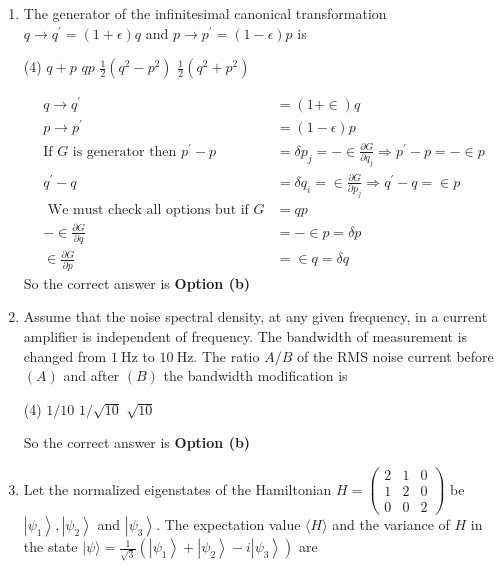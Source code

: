 \begin{enumerate}
\item The generator of the infinitesimal canonical transformation $q \rightarrow q^{\prime}=(1+\epsilon) q$ and $p \rightarrow p^{\prime}=(1-\epsilon) p$ is
 \begin{tasks}(4)
	\task[\textbf{a.}]$q+p$
	\task[\textbf{b.}]$q p$
	\task[\textbf{c.}]$\frac{1}{2}\left(q^{2}-p^{2}\right)$
	\task[\textbf{d.}] $\frac{1}{2}\left(q^{2}+p^{2}\right)$
\end{tasks}
\begin{answer}
	\begin{align*}
	q \rightarrow q^{\prime}&=(1+\in) q\\
	p \rightarrow p^{\prime}&=(1-\epsilon) p\\
	\text{If $G$ is generator then }
	p^{\prime}-p&=\delta p_{j}=-\in \frac{\partial G}{\partial q_{j}} \Rightarrow p^{\prime}-p=-\in p\\
	q^{\prime}-q&=\delta q_{i}=\in \frac{\partial G}{\partial p_{j}} \Rightarrow q^{\prime}-q=\in p\\
	\text { We must check all options but if } G&=q p\\
	-\in \frac{\partial G}{\partial q}&=-\in p=\delta p \\
	\in \frac{\partial G}{\partial p}&=\in q=\delta q
	\end{align*}
		So the correct answer is \textbf{Option (b)}
\end{answer}
\item Assume that the noise spectral density, at any given frequency, in a current amplifier is independent of frequency. The bandwidth of measurement is changed from $1 \mathrm{~Hz}$ to $10 \mathrm{~Hz}$. The ratio $A / B$ of the RMS noise current before $(A)$ and after $(B)$ the bandwidth modification is
 \begin{tasks}(4)
	\task[\textbf{a.}]$1 / 10$
	\task[\textbf{b.}] $1 / \sqrt{10}$
	\task[\textbf{c.}]$\sqrt{10}$
\end{tasks}
\begin{answer}
		So the correct answer is \textbf{Option (b)}
\end{answer}
\item Let the normalized eigenstates of the Hamiltonian $H=\left(\begin{array}{ccc}2 & 1 & 0 \\ 1 & 2 & 0 \\ 0 & 0 & 2\end{array}\right)$ be $\left|\psi_{1}\right\rangle,\left|\psi_{2}\right\rangle$ and $\left|\psi_{3}\right\rangle$. The expectation value $\langle H\rangle$ and the variance of $H$ in the state $|\psi\rangle=\frac{1}{\sqrt{3}}\left(\left|\psi_{1}\right\rangle+\left|\psi_{2}\right\rangle-i\left|\psi_{3}\right\rangle\right)$ are

\end{enumerate}
